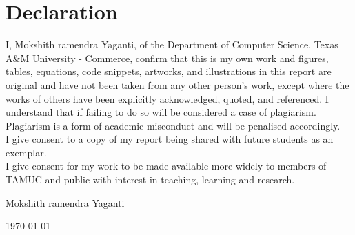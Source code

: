 \documentclass[letterpaper,11pt,oneside]{book}
\begin{document}
    
    \newpage
    \thispagestyle{empty}
    \chapter*{\Large Declaration}
    I,
     Mokshith ramendra Yaganti, %
    of the Department of Computer Science, Texas A\&M University - Commerce, confirm that this is my own work and figures, tables, equations, code snippets, artworks, and illustrations in this report are original and have not been taken from any other person's work, except where the works of others have been explicitly acknowledged, quoted, and referenced. I understand that if failing to do so will be considered a case of plagiarism. Plagiarism is a form of academic misconduct and will be penalised accordingly. \\
    
    \noindent
    I give consent to a copy of my report being shared with future students as an exemplar. \\
    
    \noindent
    I give consent for my work to be made available more widely to members of TAMUC and public with interest in teaching, learning and research. 
    ~\\[1cm]
    \begin{flushright}
	Mokshith ramendra Yaganti %
    
    \today
    \end{flushright}

     
    
\end{document}
